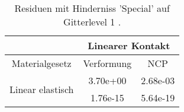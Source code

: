 \begin{table} 
\centering 
\begin{tabular}{c|cc|} 
\cline{2-3} 
 & \multicolumn{2}{|c|}{Linearer Kontakt} \\ 
\hline 
\multicolumn{1}{|c|}{Materialgesetz} & \multicolumn{1}{c|}{Verformung} & \multicolumn{1}{c|}{NCP} \\ 
\hline 
\multicolumn{1}{|c|}{\multirow{2}{*}{Linear elastisch}} &\multicolumn{1}{|c|}{  3.70e+00} & \multicolumn{1}{|c|}{  2.68e-03} \\ 
\multicolumn{1}{|c|}{} & \multicolumn{1}{|c|}{  1.76e-15} & \multicolumn{1}{|c|}{  5.64e-19} \\ 
\hline 
\end{tabular}\caption{Residuen mit Hinderniss 'Special' auf Gitterlevel 1 .}\label{tab:Residuum_Special_level1}
\end{table} 
